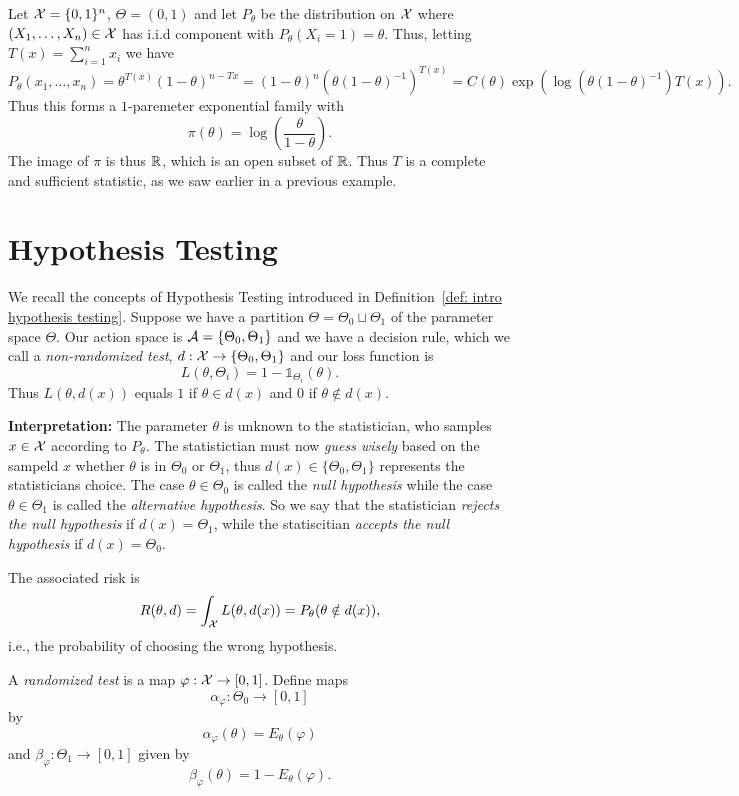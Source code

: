 \documentclass[twoside, a4paper, 10pt]{amsart}
\begin{document}
\begin{eg} Let $\mathcal{X} = \{0,1\}^n$, $\Theta = (0,1)$ and let $P_{\theta}$ be the distribution on $\mathcal{X}$ where $(X_1, \ldots, X_n) \in \mathcal{X}$ has i.i.d component with $P_{\theta}(X_i = 1) = \theta$. Thus, letting $T(x) = \sum_{i=1}^n x_i$ we have 
$$P_{\theta}(x_1, \ldots, x_n) = \theta^{T(x)}(1-\theta)^{n - T{x}} = (1-\theta)^{n} (\theta(1-\theta)^{-1})^{T(x)} = C(\theta) \exp(\log(\theta(1-\theta)^{-1}) T(x)).$$ Thus this forms a $1$-paremeter exponential family with $$\pi(\theta) = \log\left(\frac{\theta}{1-\theta}\right).$$ The image of $\pi$ is thus $\mathbb{R}$, which is an open subset of $\mathbb{R}$. Thus $T$ is a complete and sufficient statistic, as we saw earlier in a previous example. \end{eg}

\section{Hypothesis Testing}

We recall the concepts of Hypothesis Testing introduced in Definition~\ref{def: intro hypothesis testing}. Suppose we have a partition $\Theta = \Theta_0 \sqcup \Theta_1$ of the parameter space $\Theta$. Our action space is $\mathcal{A} = \{\Theta_0, \Theta_1\}$ and we have a decision rule, which we call a \textit{non-randomized test}, $d:\mathcal{X} \to \{\Theta_0, \Theta_1\}$ and our loss function is $$L(\theta, \Theta_i) = 1 - \mathds{1}_{\Theta_i}(\theta).$$ Thus $L(\theta, d(x))$ equals $1$ if $\theta \in d(x)$ and $0$ if $\theta \notin d(x)$. 

\textbf{Interpretation:} The parameter $\theta$ is unknown to the statistician, who samples $x \in \mathcal{X}$ according to $P_{\theta}$. The statistictian must now \textit{guess wisely} based on the sampeld $x$ whether $\theta$ is in $\Theta_0$ or $\Theta_1$, thus $d(x) \in \{\Theta_0, \Theta_1\}$ represents the statisticians choice. The case $\theta \in \Theta_0$ is called the \textit{null hypothesis} while the case $\theta \in \Theta_1$ is called the \textit{alternative hypothesis}. So we say that the statistician \textit{rejects the null hypothesis} if $d(x) = \Theta_1$, while the statiscitian \textit{accepts the null hypothesis} if $d(x) = \Theta_0$.

The associated risk is $$R(\theta, d) = \int_{\mathcal{X}} L(\theta, d(x)) = P_{\theta}(\theta \notin d(x)),$$ i.e., the probability of choosing the wrong hypothesis.

\begin{mydef} A \textit{randomized test} is a map $\varphi:\mathcal{X} \to [0,1]$. Define maps $$\alpha_{\varphi}:\Theta_0 \to [0,1]$$ by $$\alpha_{\varphi}(\theta) = E_{\theta}(\varphi)$$ and $\beta_{\varphi}:\Theta_1 \to [0,1]$ given by $$\beta_{\varphi}(\theta) = 1 - E_{\theta}(\varphi).$$

\end{mydef}  
\end{document}
